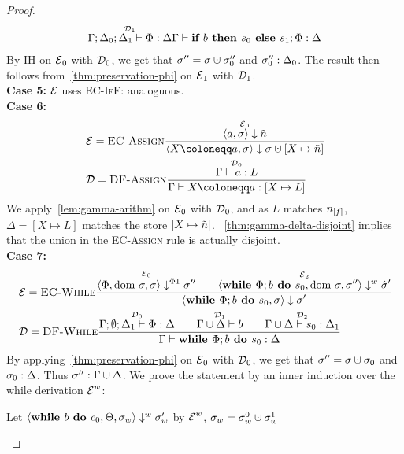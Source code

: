 \begin{proof}
\begin{align*}
{        \overset{\operatorname{\mathcal{D}}_1}{\Gamma;\Delta_0;\Delta_1 \vdash {\Phi}: \Delta}}
        {\Gamma \vdash {\textbf{if }{b} \textbf{ then }{s_0}\textbf{ else }{s_1};{\Phi}}: \Delta}
    \end{align*}
    By IH on $\operatorname{\mathcal{E}}_0$ with $\operatorname{\mathcal{D}}_0$, we get that $\store'' = \store \dunion \store''_0$ and 
    ${\sigma''_0}:{\Delta_0}$.
    The result then follows from~\autoref{thm:preservation-phi} on $\operatorname{\mathcal{E}}_1$ with $\operatorname{\mathcal{D}}_1$.\\
    \textbf{Case 5:}
    $\operatorname{\mathcal{E}}$ uses \textsc{EC-IfF}: analoguous.\\
    \textbf{Case 6:}
    \begin{align*}
        &\E = \bsrule{EC-Assign}{\overset{\E_0}{\bigstep{a}{\store}{\flaggedn{}}}}
        {\bigstep{\defaultstore}{\store}{\storeassign{\store}{X \mapsto \flaggedn{}}}}\\
        &\D = \trule{DF-Assign}{\overset{\D_0}{\typestep{\Gamma}{a}{L}}}
        {\typestep{\Gamma}{\defaultstore}{[X \mapsto L]}}
    \end{align*}
    We apply~\autoref{lem:gamma-arithm} on $\operatorname{\mathcal{E}}_0$ with $\operatorname{\mathcal{D}}_0$,
    and as $L$ matches $\flagged{}$, $\Delta = [X \mapsto L]$ matches the store
    $[X \mapsto \flaggedn{}]$.
    ~\autoref{thm:gamma-delta-disjoint} implies that the union in the \textsc{EC-Assign}
    rule is actually disjoint.
    \\
    \textbf{Case 7:}\\
    \begin{align*}
        &\operatorname{\mathcal{E}} = \textsc{EC-While}\frac{\displaystyle \overset{\operatorname{\mathcal{E}}_0}{\langle \Phi, \text{dom }{\sigma}, \sigma \rangle \downarrow^{\Phi1} \sigma''}\qquad
        \overset{\operatorname{\mathcal{E}}_2}{\langle \textbf{while }\Phi;{b} \textbf{ do } {s_0}, \text{dom }{\sigma}, \sigma'' \rangle \downarrow^w \hat{\sigma}'}}{\displaystyle \langle \textbf{while }\Phi;{b} \textbf{ do } {s_0}, \sigma \rangle \downarrow \sigma'}\\
        &\operatorname{\mathcal{D}} = \textsc{DF-While}\frac{\displaystyle \overset{\operatorname{\mathcal{D}}_0}{\Gamma;\emptyset;\Delta_1 \vdash {\Phi}: \Delta}\qquad
        \overset{\operatorname{\mathcal{D}}_1}{\Gamma \cup \Delta \vdash {b}}\qquad
        \overset{\operatorname{\mathcal{D}}_2}{\Gamma \cup \Delta \vdash {s_0}: \Delta_1}}{\displaystyle \Gamma \vdash {\textbf{while }\Phi;{b} \textbf{ do } {s_0}}: \Delta}
    \end{align*}
    By applying~\autoref{thm:preservation-phi} on $\operatorname{\mathcal{E}}_0$ with $\operatorname{\mathcal{D}}_0$, we get that
    $\store'' = \store \dunion \store_0$ and ${\sigma_0}:{\Delta}$.
    Thus ${\sigma''}:{\Gamma \cup \Delta}$.
    We prove the statement by an inner induction over the while derivation $\operatorname{\mathcal{E}}^w$:
    \begin{claim}
        Let $\langle \textbf{while }{b} \textbf{ do } {c_0}, \Theta, \sigma_w \rangle \downarrow^w \sigma_w'$ by $\operatorname{\mathcal{E}}^w$,
         $\store_w = \store_w^0 \dunion \store_w^1$

\end{claim}
\end{proof}

